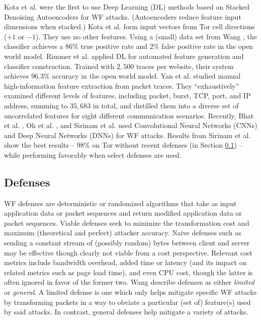 \documentclass[runningheads]{llncs}
\begin{document}
Kota et al. \cite{abe2016fingerprinting} were the first to use Deep Learning (DL) methods based on Stacked
Denoising Autoencoders for WF attacks. (Autoencoders reduce feature input dimensions when stacked.)
Kota et al. form input vectors from Tor cell directions ($+1$ or $-1$). They use no other features.
Using a (small) data set from Wang \cite{wang2016website}, the classifier achieves a $86\%$ true positive
rate and $2\%$ false positive rate in the open world model. Rimmer et al. \cite{rimmer2018automated}
applied DL for automated feature generation and classifier construction. Trained with $2,500$ traces
per website, their system achieves $96.3\%$ accuracy in the open world model. Yan et al. \cite{yan2018feature}
studied manual high-information feature extraction from packet traces. They ``exhaustively'' examined different
levels of features, including packet, burst, TCP, port, and IP address, summing to $35,683$ in total, and
distilled them into a diverse set of uncorrelated features for eight different communication scenarios.
Recently, Bhat et al. \cite{bhat2018var}, Oh et al. \cite{oh2017pfp}, and Sirinam et al. \cite{sirinam2018deep}
used Convolutional Neural Networks (CNNs) and Deep Neural Networks (DNNs) for WF attacks. Results from
Sirinam et al. show the best results -- $98\%$ on Tor without recent defenses (in Section \ref{sec:defenses}) --
while performing favorably when select defenses are used.

\subsection{Defenses} \label{sec:defenses}
WF defenses are deterministic or randomized algorithms that take as input application data or packet sequences
and return modified application data or packet sequences. Viable defenses seek to minimize the transformation
cost and maximum (theoretical and perfect) attacker accuracy. Naive defenses such as sending a constant stream
of (possibly random) bytes between client and server may be effective though clearly not viable from a cost
perspective. Relevant cost metrics include bandwidth overhead, added time or latency (and its impact on related
metrics such as page load time), and even CPU cost, though the latter is often ignored in favor of the former two.
Wang \cite{wang2016website} describe defenses as either \emph{limited} or \emph{general}. A limited defense is
one which only helps mitigate specific WF attacks by transforming packets in a way to obviate a particular
(set of) feature(s) used by said attacks. In contrast, general defenses help mitigate a variety of attacks.
\end{document}
